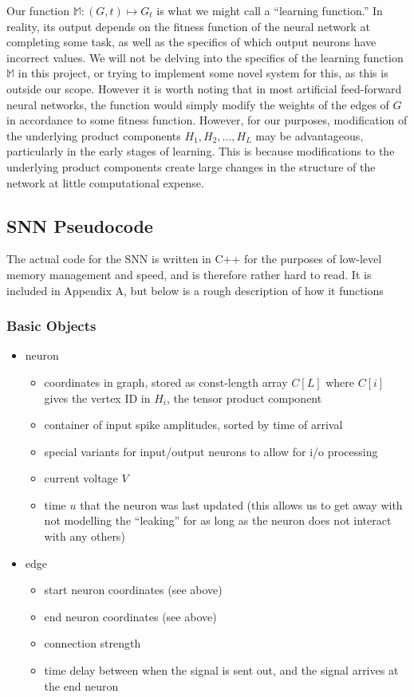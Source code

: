 \documentclass{article}
\newcommand{\listvec}[2]{#1_1, #1_2, \ldots, #1_{#2}}
\newcommand{\M}{\mathbb{M}}
\begin{document}
Our function $\M : (G, t) \mapsto G_t$ is what we might call a ``learning function.'' In reality, its output depends on the fitness function of the neural network at completing some task, as well as the specifics of which output neurons have incorrect values. We will not be delving into the specifics of the learning function $\M$ in this project, or trying to implement some novel system for this, as this is outside our scope. However it is worth noting that in most artificial feed-forward neural networks, the function would simply modify the weights of the edges of $G$ in accordance to some fitness function. However, for our purposes, modification of the underlying product components $\listvec{H}{L}$ may be advantageous, particularly in the early stages of learning. This is because modifications to the underlying product components create large changes in the structure of the network at little computational expense.

\newpage

\subsection{SNN Pseudocode} \label{pseudocode}

The actual code for the SNN is written in C++ for the purposes of low-level memory management and speed, and is therefore rather hard to read. It is included in Appendix A, but below is a rough description of how it functions

\subsubsection{Basic Objects}
\begin{itemize}
    \item neuron
    \begin{itemize}
        \item coordinates in graph, stored as const-length array $C[L]$ where $C[i]$ gives the vertex ID in $H_i$, the tensor product component
        \item container of input spike amplitudes, sorted by time of arrival
        \item special variants for input/output neurons to allow for i/o processing
        \item current voltage $V$
        \item time $u$ that the neuron was last updated (this allows us to get away with not modelling the ``leaking'' for as long as the neuron does not interact with any others)
    \end{itemize}
    \item edge 
        \begin{itemize}
        \item start neuron coordinates (see above)
        \item end neuron coordinates (see above)
        \item connection strength
        \item time delay between when the signal is sent out, and the signal arrives at the end neuron
    \end{itemize}
\end{itemize}
\end{document}
